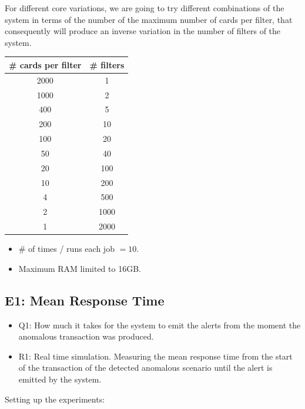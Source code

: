 For different core variations, we are going to try different combinations of the system in terms
of the number of the maximum number of cards per filter, that consequently will produce an inverse variation in the number of filters of the system.

\begin{table}[H]
  \renewcommand{\arraystretch}{1.5} %
  \centering
  \begin{tabular}{|c|c|}
  \hline
  \# cards per filter & \# filters \\ \hline
  2000   &   1     \\ \hline
  1000   &   2     \\ \hline
  400 &   5     \\ \hline
  200  &   10     \\ \hline
  100 &   20    \\ \hline
  50  &   40    \\ \hline
  20  &   100    \\ \hline
  10  &   200    \\ \hline
  4  &   500    \\ \hline
  2  &   1000    \\ \hline
  1  &   2000    \\ \hline
  \end{tabular}
\end{table}

\begin{itemize}
  \item \# of times / runs each job $=10$.
  \item Maximum RAM limited to 16GB.
\end{itemize}

\subsection{E1: Mean Response Time}

\begin{itemize}
  \item Q1: How much it takes for the system to emit the alerts from the moment the anomalous transaction was produced.
  \item R1: Real time simulation. Measuring the mean response time from the start of the transaction of the detected anomalous scenario until the alert is emitted by the system.
\end{itemize}

Setting up the experiments:

